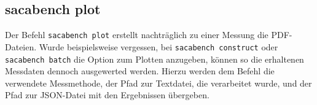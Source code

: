\subsection{sacabench plot}
\label{framework:cli:sacabench-plot}

Der Befehl \texttt{sacabench plot} erstellt nachträglich zu einer Messung die PDF-Dateien. 
Wurde beispielsweise vergessen, bei \texttt{sacabench construct} oder \texttt{saca\-bench batch} die Option zum Plotten anzugeben, können so die erhaltenen Messdaten dennoch ausgewerted werden.
Hierzu werden dem Befehl die verwendete Messmethode, der Pfad zur Textdatei, die verarbeitet wurde, und der Pfad zur JSON-Datei mit den Ergebnissen übergeben.

